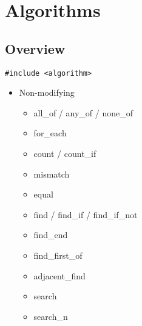 \section{Algorithms}
\label{Algorithmen}
\subsection{Overview}
\begin{lstlisting}
#include <algorithm>
\end{lstlisting}
\begin{itemize}
	\item Non-modifying
		\begin{itemize}
			\item all\_of / any\_of / none\_of
			\item for\_each
			\item count / count\_if
			\item mismatch
			\item equal
			\item \label{find} find / find\_if / find\_if\_not
			\item find\_end
			\item find\_first\_of
			\item adjacent\_find
			\item search
			\item search\_n


\end{itemize}
\end{itemize}
